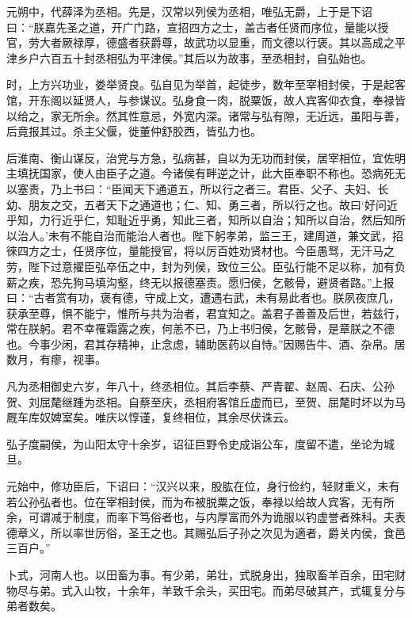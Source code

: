 \documentclass[12pt,UTF8]{ctexbook}
\begin{document}
元朔中，代薛泽为丞相。先是，汉常以列侯为丞相，唯弘无爵，上于是下诏曰：“朕嘉先圣之道，开广门路，宣招四方之士，盖古者任贤而序位，量能以授官，劳大者厥禄厚，德盛者获爵尊，故武功以显重，而文德以行褒。其以高成之平津乡户六百五十封丞相弘为平津侯。”其后以为故事，至丞相封，自弘始也。



时，上方兴功业，娄举贤良。弘自见为举首，起徒步，数年至宰相封侯，于是起客馆，开东阁以延贤人，与参谋议。弘身食一肉，脱粟饭，故人宾客仰衣食，奉禄皆以给之，家无所余。然其性意忌，外宽内深。诸常与弘有隙，无近远，虽阳与善，后竟报其过。杀主父偃，徙董仲舒胶西，皆弘力也。



后淮南、衡山谋反，治党与方急，弘病甚，自以为无功而封侯，居宰相位，宜佐明主填抚国家，使人由臣子之道。今诸侯有畔逆之计，此大臣奉职不称也。恐病死无以塞责，乃上书曰：“臣闻天下通道五，所以行之者三。君臣、父子、夫妇、长幼、朋友之交，五者天下之通道也；仁、知、勇三者，所以行之也。故曰‘好问近乎知，力行近乎仁，知耻近乎勇，知此三者，知所以自治；知所以自治，然后知所以治人。’未有不能自治而能治人者也。陛下躬孝弟，监三王，建周道，兼文武，招徠四方之士，任贤序位，量能授官，将以厉百姓劝贤材也。今臣愚驽，无汗马之劳，陛下过意擢臣弘卒伍之中，封为列侯，致位三公。臣弘行能不足以称，加有负薪之疾，恐先狗马填沟壑，终无以报德塞责。愿归侯，乞骸骨，避贤者路。”上报曰：“古者赏有功，褒有德，守成上文，遭遇右武，未有易此者也。朕夙夜庶几，获承至尊，惧不能宁，惟所与共为治者，君宜知之。盖君子善善及后世，若兹行，常在朕躬。君不幸罹霜露之疾，何恙不已，乃上书归侯，乞骸骨，是章朕之不德也。今事少闲，君其存精神，止念虑，辅助医药以自恃。”因赐告牛、酒、杂帛。居数月，有瘳，视事。



凡为丞相御史六岁，年八十，终丞相位。其后李蔡、严青翟、赵周、石庆、公孙贺、刘屈氂继踵为丞相。自蔡至庆，丞相府客馆丘虚而已，至贺、屈氂时坏以为马厩车库奴婢室矣。唯庆以惇谨，复终相位，其余尽伏诛云。



弘子度嗣侯，为山阳太守十余岁，诏征巨野令史成诣公车，度留不遣，坐论为城旦。



元始中，修功臣后，下诏曰：“汉兴以来，股肱在位，身行俭约，轻财重义，未有若公孙弘者也。位在宰相封侯，而为布被脱粟之饭，奉禄以给故人宾客，无有所余，可谓减于制度，而率下笃俗者也，与内厚富而外为诡服以钓虚誉者殊科。夫表德章义，所以率世厉俗，圣王之也。其赐弘后子孙之次见为適者，爵关内侯，食邑三百户。”



卜式，河南人也。以田畜为事。有少弟，弟壮，式脱身出，独取畜羊百余，田宅财物尽与弟。式入山牧，十余年，羊致千余头，买田宅。而弟尽破其产，式辄复分与弟者数矣。
\end{document}
